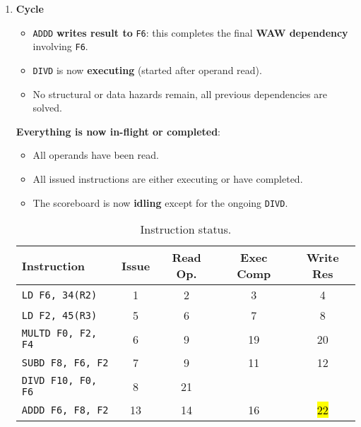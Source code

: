 \begin{enumerate}
    \newpage


    \item \textbf{Cycle \theenumi}
    \begin{itemize}
        \item[\textcolor{Green3}{\faIcon{check}}] \texttt{ADDD} \textbf{writes result to} \texttt{F6}: this completes the final \textbf{WAW dependency} involving \texttt{F6}.
        \item \texttt{DIVD} is now \textbf{executing} (started after operand read).
        \item No structural or data hazards remain, all previous dependencies are solved.
    \end{itemize}
    \textbf{Everything is now in-flight or completed}:
    \begin{itemize}
        \item All operands have been read.
        \item All issued instructions are either executing or have completed.
        \item The scoreboard is now \textbf{idling} except for the ongoing \texttt{DIVD}.
    \end{itemize}

    \begin{table}[!htp]
        \centering
        \begin{tabular}{@{} l | c c c c @{}}
            \toprule
            Instruction                 & Issue     & Read Op.  & Exec Comp & Write Res \\
            \midrule
            \texttt{LD    F6, 34(R2)}   & 1         & 2         & 3         & 4         \\ [.3em]
            \texttt{LD    F2, 45(R3)}   & 5         & 6         & 7         & 8         \\ [.3em]
            \texttt{MULTD F0, F2, F4}   & 6         & 9         & 19        & 20        \\ [.3em]
            \texttt{SUBD  F8, F6, F2}   & 7         & 9         & 11        & 12        \\ [.3em]
            \texttt{DIVD  F10, F0, F6}  & 8         & 21        &           &           \\ [.3em]
            \texttt{ADDD  F6, F8, F2}   & 13        & 14        & 16        & \hl{22}   \\
            \bottomrule
        \end{tabular}
        \caption*{Instruction status.}
    \end{table}


\end{enumerate}

